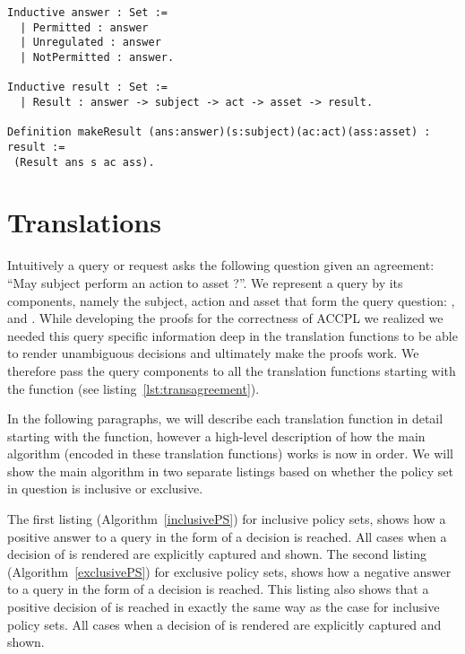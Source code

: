 \begin{minipage}[c]{0.95\textwidth}
\begin{lstlisting}
Inductive answer : Set :=
  | Permitted : answer
  | Unregulated : answer
  | NotPermitted : answer.
  
Inductive result : Set :=
  | Result : answer -> subject -> act -> asset -> result.
 
Definition makeResult (ans:answer)(s:subject)(ac:act)(ass:asset) : result := 
 (Result ans s ac ass).
\end{lstlisting}
\end{minipage}

\section{Translations}\label{sec:translationfuncs}

Intuitively a query or request asks the following question given an agreement: ``May subject  perform an action  to asset ?''. We represent a query by its components, namely the subject, action and asset that form the query question: ,  and . While developing the proofs for the correctness of \ac{ACCPL} we realized we needed this query specific information deep in the translation functions to be able to render unambiguous decisions and ultimately make the proofs work. We therefore pass the query components to all the translation functions starting with the  function (see listing~\ref{lst:transagreement}). 

In the following paragraphs, we will describe each translation function in detail starting with the  function, however a high-level description of how the main algorithm (encoded in these translation functions) works is now in order. We will show the main algorithm in two separate listings based on whether the policy set in question is inclusive or exclusive. 

The first listing (Algorithm~\ref{inclusivePS}) for inclusive policy sets, shows how a positive answer to a query in the form of a  decision is reached. All cases when a decision of  is rendered are explicitly captured and shown. The second listing (Algorithm~\ref{exclusivePS}) for exclusive policy sets, shows how a negative answer to a query in the form of a  decision is reached. This listing also shows that a positive decision of  is reached in exactly the same way as the case for inclusive policy sets. All cases when a decision of  is rendered are explicitly captured and shown.

